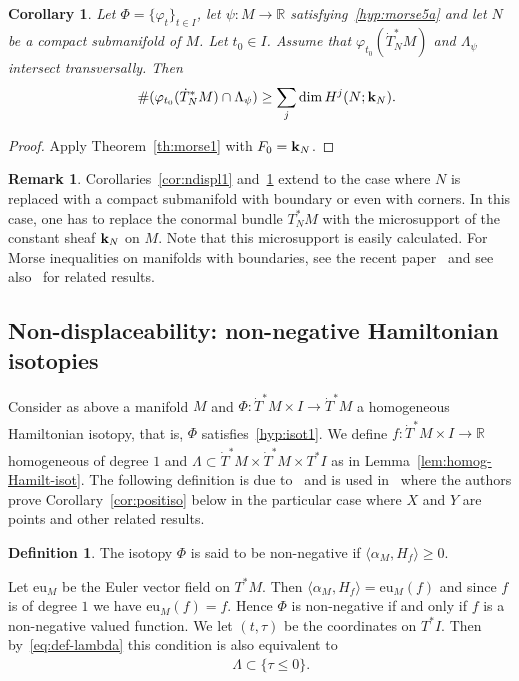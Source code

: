 \documentclass[12pt,leqno]{article}
\newtheorem{corollary}[theorem]{Corollary}
\theoremstyle{definition}
\newtheorem{definition}[theorem]{Definition}
\newtheorem{remark}[theorem]{Remark}
\newcommand{\R}{{\mathbb{R}}}
\def\phi{{\varphi}}
\newcommand{\cor}{{\bf k}}
\renewcommand{\to}[1][]{\xrightarrow[]{#1}}
\newcommand{\cl}{\colon}
\newcommand{\eqn}{\begin{eqnarray*}}
\newcommand{\eneqn}{\end{eqnarray*}}
\newcommand{\dT}{{\dot{T}}}
\newcommand{\dTM}{{\dT}^*M}
\newcommand{\eu}{\mathrm{eu}}
\numberwithin{equation}{section}
\begin{document}
\begin{corollary}\label{cor:ndispl2}
Let $\Phi=\{\phi_t\}_{t\in I}$, let $\psi\cl M\to\R$ 
satisfying~\eqref{hyp:morse5a} and let $N$ be a compact submanifold of $M$.
Let  $t_0\in I$. Assume that 
$\phi_{t_0}(\dT_N^*M)$ and $\Lambda_\psi$ intersect transversally. Then
\eqn
&&\#(\phi_{t_0}(\dT_N^*M) \cap \Lambda_\psi)\ge
\sum_j \dim H^j(N;\cor_N).
\eneqn
\end{corollary}
\begin{proof}
Apply Theorem~\ref{th:morse1} with $F_0=\cor_N$. 
\end{proof}
\begin{remark}\label{rem:corner}
Corollaries~\ref{cor:ndispl1} and~\ref{cor:ndispl2}
extend to the case where $N$ is replaced
with a compact submanifold with boundary or even with corners. In this
case, one has to replace the conormal bundle $T^*_NM$ with the
microsupport of the constant sheaf $\cor_N$ on $M$. Note that this microsupport
is easily calculated. 
For Morse inequalities on manifolds with
boundaries, see the recent paper~\cite{L10} and 
see also~\cite{KO01,O98} for related results.
\end{remark}


\subsection{Non-displaceability:  non-negative Hamiltonian isotopies}
Consider as above a manifold $M$ and $\Phi\cl \dTM\times I\to \dTM$ a
homogeneous Hamiltonian isotopy, 
that is, $\Phi$ satisfies~\eqref{hyp:isot1}.
We define $f\cl \dTM\times I\to\R$ homogeneous of degree $1$
and $\Lambda\subset \dTM\times\dTM\times T^*I$ as
in Lemma~\ref{lem:homog-Hamilt-isot}.
The following definition is due to~\cite{EKP06}
and is used in~\cite{CN10, CFP10} where the authors prove
Corollary~\ref{cor:positiso} below 
in the particular case where $X$
and $Y$ are points and other related results.

\begin{definition}\label{def:positisot}
The isotopy $\Phi$ is said to be non-negative if 
$\langle \alpha_M, H_f \rangle \geq 0$.
\end{definition}
Let $\eu_M$ be the Euler vector field on $T^*M$. 
Then $\langle\alpha_M,H_f\rangle=\eu_M(f)$ and since $f$ is 
of degree $1$ we have $\eu_M(f)=f$. Hence
$\Phi$ is non-negative if and only if $f$ is a non-negative valued function.  
We let $(t,\tau)$ be the
coordinates on $T^*I$. Then by~\eqref{eq:def-lambda} this condition is  also
equivalent to 
\eqn
&&\Lambda\subset \{\tau \leq 0 \}. 
\eneqn
\end{document}
